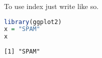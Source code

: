 To use index just write  like so.
\begin{lstlisting}[language = R, caption = R example]
library(ggplot2)
x = "SPAM"
x
\end{lstlisting}

\begin{verbatim}
[1] "SPAM"
\end{verbatim}
